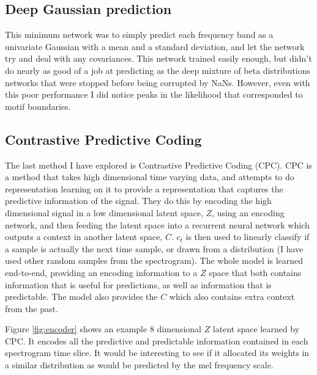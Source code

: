 \subsection{Deep Gaussian prediction}
This minimum network was to simply predict each frequency band as a univariate Gaussian with a mean and a standard deviation, and let the network try and deal with any covariances. This network trained easily enough, but didn't do nearly as good of a job at predicting as the deep mixture of beta distributions networks that were stopped before being corrupted by NaNs. However, even with this poor performance I did notice peaks in the likelihood that corresponded to motif boundaries.

\subsection{Contrastive Predictive Coding}
The last method I have explored is Contrastive Predictive Coding (CPC)\cite{CPC}. CPC is a method that takes high dimensional time varying data, and attempts to do representation learning on it to provide a representation that captures the predictive information of the signal. They do this by encoding the high dimensional signal in a low dimensional latent space, $Z$, using an encoding network, and then feeding the latent space into a recurrent neural network which outputs a context in another latent space, $C$. $c_t$ is then used to linearly classify if a sample is actually the next time sample, or drawn from a distribution (I have used other random samples from the spectrogram). The whole model is learned end-to-end, providing an encoding information to a $Z$ space that both contains information that is useful for predictions, as well as information that is predictable. The model also provides the $C$ which also contains extra context from the past.

Figure \ref{fig:encoder} shows an example 8 dimensional $Z$ latent space learned by CPC. It encodes all the predictive and predictable information contained in each spectrogram time slice. It would be interesting to see if it allocated its weights in a similar distribution as would be predicted by the mel frequency scale.

